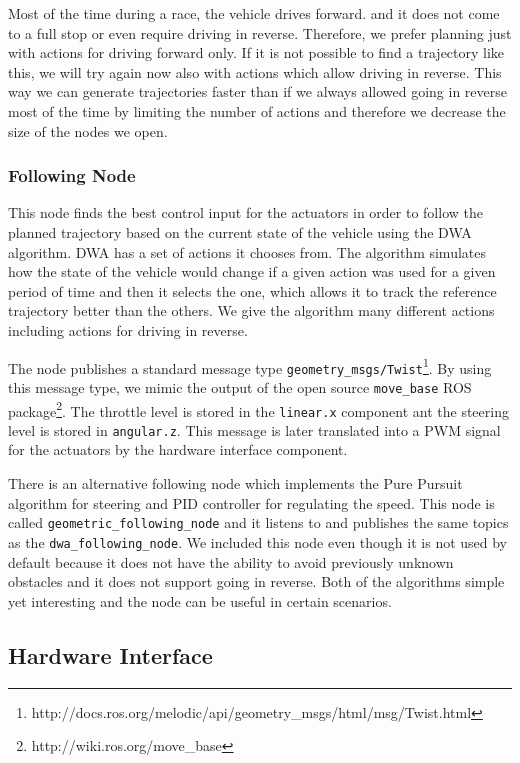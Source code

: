 Most of the time during a race, the vehicle drives forward. and it does not come to a full stop or even require driving in reverse. Therefore, we prefer planning just with actions for driving forward only. If it is not possible to find a trajectory like this, we will try again now also with actions which allow driving in reverse. This way we can generate trajectories faster than if we always allowed going in reverse most of the time by limiting the number of actions and therefore we decrease the size of the nodes we open.

\subsubsection{Following Node}

This node finds the best control input for the actuators in order to follow the planned trajectory based on the current state of the vehicle using the \gls{DWA} algorithm. \gls*{DWA} has a set of actions it chooses from. The algorithm simulates how the state of the vehicle would change if a given action was used for a given period of time and then it selects the one, which allows it to track the reference trajectory better than the others. We give the algorithm many different actions including actions for driving in reverse.

The node publishes a standard message type \verb|geometry_msgs/Twist|\footnote{http://docs.ros.org/melodic/api/geometry\_msgs/html/msg/Twist.html}. By using this message type, we mimic the output of the open source \verb|move_base| \gls*{ROS} package\footnote{http://wiki.ros.org/move\_base}. The throttle level is stored in the \verb|linear.x| component ant the steering level is stored in \verb|angular.z|. This message is later translated into a \gls*{PWM} signal for the actuators by the hardware interface component.

There is an alternative following node which implements the Pure Pursuit algorithm for steering and \gls*{PID} controller for regulating the speed. This node is called \verb|geometric_following_node| and it listens to and publishes the same topics as the \verb|dwa_following_node|. We included this node even though it is not used by default because it does not have the ability to avoid previously unknown obstacles and it does not support going in reverse. Both of the algorithms simple yet interesting and the node can be useful in certain scenarios.

\subsection{Hardware Interface}

